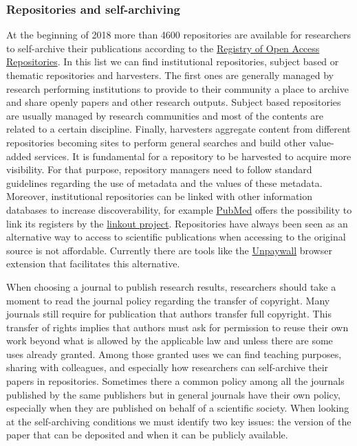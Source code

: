 \documentclass{article}
\begin{document}
\subsubsection{\textbf{Repositories and self-archiving}}\label{H1034391}



At the beginning of 2018 more than 4600 repositories are available for researchers to self-archive their publications according to the \href{http://roar.eprints.org/}{Registry of Open Access Repositories}. In this list we can find institutional repositories, subject based or thematic repositories and harvesters. The first ones are generally managed by research performing institutions to provide to their community a place to archive and share openly papers and other research outputs. Subject based repositories are usually managed by research communities and most of the contents are related to a certain discipline. Finally, harvesters aggregate content from different repositories becoming sites to perform general searches and build other value-added services. It is fundamental for a repository to be harvested to acquire more visibility. For that purpose, repository managers need to follow standard guidelines regarding the use of metadata and the values of these metadata. Moreover, institutional repositories can be linked with other information databases to increase discoverability, for example \href{https://www.ncbi.nlm.nih.gov/pubmed/}{PubMed} offers the possibility to link its registers by the \href{https://www.ncbi.nlm.nih.gov/projects/linkout/doc/IR-application.shtml}{linkout project}. Repositories have always been seen as an alternative way to access to scientific publications when accessing to the original source is not affordable. Currently there are tools like the \href{http://unpaywall.org/}{Unpaywall} browser extension that facilitates this alternative.


When choosing a journal to publish research results, researchers should take a moment to read the journal policy regarding the transfer of copyright. Many journals still require for publication that authors transfer full copyright. This transfer of rights implies that authors must ask for permission to reuse their own work beyond what is allowed by the applicable law and unless there are some uses already granted. Among those granted uses we can find teaching purposes, sharing with colleagues, and especially how researchers can self-archive their papers in repositories. Sometimes there a common policy among all the journals published by the same publishers but in general journals have their own policy, especially when they are published on behalf of a scientific society. When looking at the self-archiving conditions we must identify two key issues: the version of the paper that can be deposited and when it can be publicly available.
\end{document}
